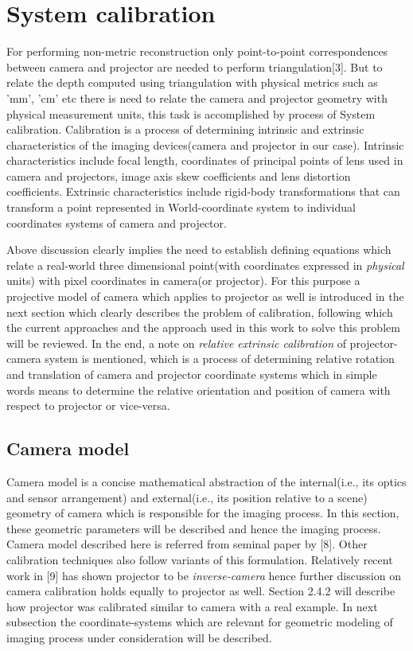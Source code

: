 \chapter{System calibration} 
 
         
For performing non-metric reconstruction only point-to-point correspondences between camera and projector are needed to perform triangulation[3]. But to relate the depth computed using triangulation with physical metrics such as 'mm', 'cm' etc there is need to relate the camera and projector geometry with physical measurement units, this task is accomplished by process of System calibration.  Calibration is a process of determining intrinsic and extrinsic characteristics of the imaging devices(camera and projector in our case). Intrinsic characteristics include focal length, coordinates of principal points of lens used in camera and projectors, image axis skew coefficients and lens distortion coefficients. Extrinsic characteristics include rigid-body transformations that can transform a point represented in World-coordinate system to individual coordinates systems of camera and projector. \newline 

 
Above discussion clearly implies the need to establish defining equations which relate a real-world three dimensional point(with coordinates expressed in \textit{physical} units) with pixel coordinates in camera(or projector). For this purpose a projective model of camera which applies to projector as well is introduced in the next section which clearly describes the problem of calibration, following which the current approaches and the approach used in this work to solve this problem will be reviewed. In the end, a note on \textit{relative extrinsic calibration} of projector-camera system is mentioned, which is a process of determining relative rotation and translation of camera and projector coordinate systems which in simple words means to determine the relative orientation and position of camera with respect to projector or vice-versa.   
  
\section{Camera model}   
Camera model is a concise mathematical abstraction of the internal(i.e., its optics and sensor arrangement) and external(i.e., its position relative to a scene) geometry of camera which is responsible for the imaging process. In this section, these geometric parameters will be described and hence the imaging process. Camera model described here is referred from seminal paper by [8]. Other calibration techniques also follow variants of this formulation. Relatively recent work in [9] has shown projector to be \textit{inverse-camera} hence further discussion on camera calibration holds equally to projector as well. Section 2.4.2 will describe how  projector was calibrated similar to camera with a real example. In next subsection the coordinate-systems which are relevant for geometric modeling of imaging process under consideration will be described.  
  
